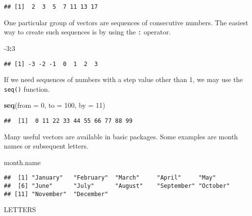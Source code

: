 \documentclass[]{book}
\newenvironment{Shaded}{\begin{snugshade}}{\end{snugshade}}
\newcommand{\KeywordTok}[1]{\textcolor[rgb]{0.13,0.29,0.53}{\textbf{#1}}}
\newcommand{\DataTypeTok}[1]{\textcolor[rgb]{0.13,0.29,0.53}{#1}}
\newcommand{\DecValTok}[1]{\textcolor[rgb]{0.00,0.00,0.81}{#1}}
\newcommand{\OperatorTok}[1]{\textcolor[rgb]{0.81,0.36,0.00}{\textbf{#1}}}
\newcommand{\NormalTok}[1]{#1}
\theoremstyle{definition}
\theoremstyle{definition}
\theoremstyle{definition}
\theoremstyle{remark}
\begin{document}
\begin{verbatim}
## [1]  2  3  5  7 11 13 17
\end{verbatim}

One particular group of vectors are sequences of consecutive numbers.
The easiest way to create such sequences is by using the \texttt{:}
operator.

\begin{Shaded}
\begin{Highlighting}[]
\DecValTok{-3}\OperatorTok{:}\DecValTok{3}
\end{Highlighting}
\end{Shaded}

\begin{verbatim}
## [1] -3 -2 -1  0  1  2  3
\end{verbatim}

If we need sequences of numbers with a step value other than 1, we may
use the \texttt{seq()} function.

\begin{Shaded}
\begin{Highlighting}[]
\KeywordTok{seq}\NormalTok{(}\DataTypeTok{from =} \DecValTok{0}\NormalTok{, }\DataTypeTok{to =} \DecValTok{100}\NormalTok{, }\DataTypeTok{by =} \DecValTok{11}\NormalTok{)}
\end{Highlighting}
\end{Shaded}

\begin{verbatim}
##  [1]  0 11 22 33 44 55 66 77 88 99
\end{verbatim}

Many useful vectors are available in basic packages. Some examples are
month names or subsequent letters.

\begin{Shaded}
\begin{Highlighting}[]
\NormalTok{month.name}
\end{Highlighting}
\end{Shaded}

\begin{verbatim}
##  [1] "January"   "February"  "March"     "April"     "May"      
##  [6] "June"      "July"      "August"    "September" "October"  
## [11] "November"  "December"
\end{verbatim}

\begin{Shaded}
\begin{Highlighting}[]
\NormalTok{LETTERS}
\end{Highlighting}
\end{Shaded}
\end{document}
